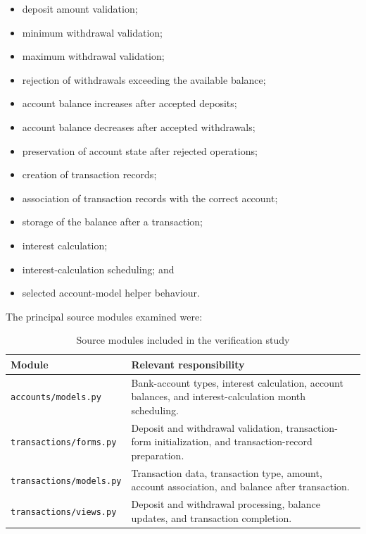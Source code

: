 \documentclass[12pt]{article}
\begin{document}
\begin{itemize}
    \item deposit amount validation;
    \item minimum withdrawal validation;
    \item maximum withdrawal validation;
    \item rejection of withdrawals exceeding the available balance;
    \item account balance increases after accepted deposits;
    \item account balance decreases after accepted withdrawals;
    \item preservation of account state after rejected operations;
    \item creation of transaction records;
    \item association of transaction records with the correct account;
    \item storage of the balance after a transaction;
    \item interest calculation;
    \item interest-calculation scheduling; and
    \item selected account-model helper behaviour.
\end{itemize}

The principal source modules examined were:

\begin{table}[H]
\centering
\caption{Source modules included in the verification study}
\label{tab:selected-modules}

\begin{tabular}{|p{5.2cm}|p{8.5cm}|}
\hline
\textbf{Module} & \textbf{Relevant responsibility} \\
\hline

\texttt{accounts/models.py} &
Bank-account types, interest calculation, account balances, and
interest-calculation month scheduling. \\
\hline

\texttt{transactions/forms.py} &
Deposit and withdrawal validation, transaction-form initialization, and
transaction-record preparation. \\
\hline

\texttt{transactions/models.py} &
Transaction data, transaction type, amount, account association, and balance
after transaction. \\
\hline

\texttt{transactions/views.py} &
Deposit and withdrawal processing, balance updates, and transaction
completion. \\
\hline

\end{tabular}
\end{table}
\end{document}
